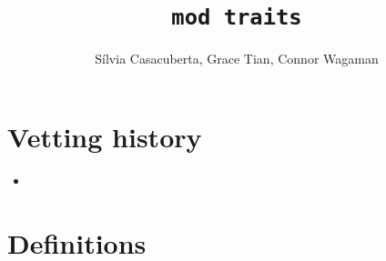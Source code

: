 \documentclass{article}
\title{\texttt{mod traits}}
\author{S\'ilvia Casacuberta, Grace Tian, Connor Wagaman}
\date{}
\begin{document}
\maketitle

\contrib

\section{Vetting history}
\begin{itemize}
    \item {}
\end{itemize}

\section{Definitions}
\end{document}
